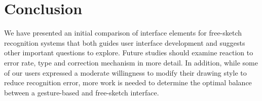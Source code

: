 \documentclass{egpubl}
\begin{document}


\section{Conclusion}
We have presented an initial comparison of interface elements for
free-sketch recognition systems that both guides user interface
development and suggests other important questions to explore.  Future
studies should examine reaction to error rate, type and correction
mechanism in more detail.  In addition, while some of our users
expressed a moderate willingness to modify their drawing style to
reduce recognition error, more work is needed to determine the optimal
balance between a gesture-based and free-sketch interface.
\end{document}
